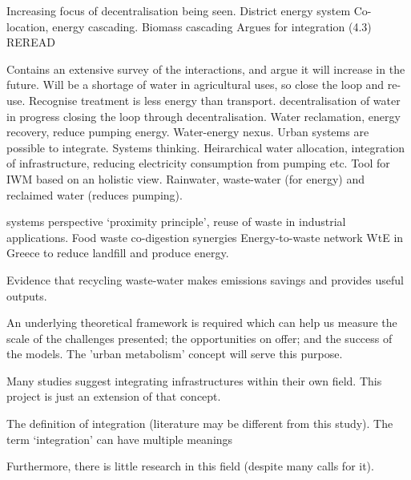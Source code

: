 \citep{Ren2010} Increasing focus of decentralisation being seen.
\citep{Weber2011} District energy system
\citep{Grubler2009} Co-location, energy cascading.
\citep{Haberl2002} Biomass cascading
\citep{Kierstead2012b} Argues for integration (4.3)
\citep{Sugihara2004} REREAD


\citep{McMahon2011} Contains an extensive survey of the interactions, and argue it will increase in the future.
\citep{Vouvoulis2012} Will be a shortage of water in agricultural uses, so close the loop and re-use. Recognise treatment is less energy than transport.
\citep{Brown2009} decentralisation of water in progress
\citep{Diagger2009} closing the loop through decentralisation. Water reclamation, energy recovery, reduce pumping energy. Water-energy nexus.
\citep{Hardy2005} Urban systems are possible to integrate. Systems thinking.
\citep{Lim2010} Heirarchical water allocation, integration of infrastructure, reducing electricity consumption from pumping etc.
\citep{Makropulos2008} Tool for IWM based on an holistic view.
\citep{Nickson2011} Rainwater, waste-water (for energy) and reclaimed water (reduces pumping).

\citep{Eriksson2002} systems perspective
\citep{Geng2010} `proximity principle', reuse of waste in industrial applications.
\citep{Iacovidou2012} Food waste co-digestion synergies
\citep{Kharrazi2012} Energy-to-waste network
\citep{Xydis2012} WtE in Greece to reduce landfill and produce energy.

\citep{Lundin2000} Evidence that recycling waste-water makes emissions savings and provides useful outputs.


An underlying theoretical framework is required which can help us measure the scale of the challenges presented; the opportunities on offer; and the success of the models. The 'urban metabolism' concept will serve this purpose.

Many studies suggest integrating infrastructures within their own field. This project is just an extension of that concept.

The definition of integration (literature may be different from this study).
The term `integration' can have multiple meanings

Furthermore, there is little research in this field (despite many calls for it).  


